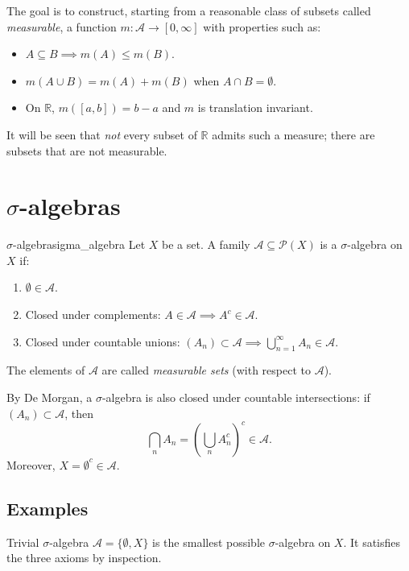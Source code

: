 \documentclass[11pt, a4paper]{article}
\begin{document}
The goal is to construct, starting from a reasonable class of subsets called
\emph{measurable}, a function $m: \mathcal{A} \to [0, \infty]$ with properties such as:
\begin{itemize}
    \item $A \subseteq B \implies m(A) \le m(B)$.
    \item $m(A \cup B) = m(A) + m(B)$ when $A \cap B = \emptyset$.
    \item On $\mathbb{R}$, $m([a, b]) = b - a$ and $m$ is translation invariant.
\end{itemize}
It will be seen that \emph{not} every subset of $\mathbb{R}$ admits such a measure; there are subsets
 that are not measurable.

\newpage

\section{\texorpdfstring{$\sigma$}{σ}-algebras}

\begin{definicion}{$\sigma$-algebra}{sigma_algebra}
Let $X$ be a set. A family $\mathcal{A} \subseteq \mathcal{P}(X)$ is a $\sigma$-algebra
on $X$ if:
\begin{enumerate}
    \item $\emptyset \in \mathcal{A}$.
    \item Closed under complements: $A \in \mathcal{A} \implies A^c \in \mathcal{A}$.
    \item Closed under countable unions: $(A_n) \subset \mathcal{A} \implies
    \bigcup_{n=1}^\infty A_n \in \mathcal{A}$.
\end{enumerate}
The elements of $\mathcal{A}$ are called \emph{measurable sets} (with respect to $\mathcal{A}$).
\end{definicion}

\obs By De Morgan, a $\sigma$-algebra is also closed under countable intersections: if
$(A_n) \subset \mathcal{A}$, then
$$ \bigcap_n A_n = \left( \bigcup_n A_n^c \right)^c \in \mathcal{A}. $$
Moreover, $X = \emptyset^c \in \mathcal{A}$.

\subsection{Examples}

\begin{ejemplo}{Trivial $\sigma$-algebra}{}
$\mathcal{A} = \{\emptyset, X\}$ is the smallest possible $\sigma$-algebra on $X$. It satisfies
the three axioms by inspection.
\end{ejemplo}
\end{document}

